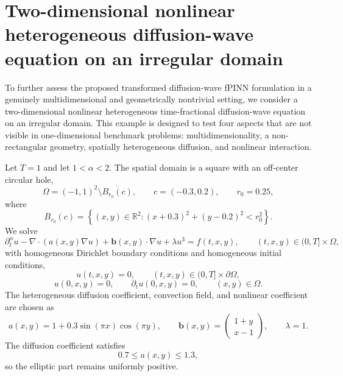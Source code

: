 \documentclass[11pt]{article}
\newcommand{\Dtalpha}{\partial_t^\alpha}
\newcommand{\R}{\mathbb{R}}
\newcommand{\bb}{\bm b}
\newcommand{\grad}{\nabla}
\begin{document}
\section{Two-dimensional nonlinear heterogeneous diffusion-wave equation on an irregular domain}
\label{sec:irregular-2d-dw}

To further assess the proposed transformed diffusion-wave fPINN formulation in a genuinely multidimensional and geometrically nontrivial setting, we consider a two-dimensional nonlinear heterogeneous time-fractional diffusion-wave equation on an irregular domain. This example is designed to test four aspects that are not visible in one-dimensional benchmark problems: multidimensionality, a non-rectangular geometry, spatially heterogeneous diffusion, and nonlinear interaction.

Let $T=1$ and let $1<\alpha<2$. The spatial domain is a square with an off-center circular hole,
\begin{equation}
\Omega=
(-1,1)^2\setminus \overline{B_{r_0}(c)},
\qquad
c=(-0.3,0.2),
\qquad
r_0=0.25,
\label{eq:irregular-domain}
\end{equation}
where
\[
B_{r_0}(c)=\left\{(x,y)\in\R^2:(x+0.3)^2+(y-0.2)^2<r_0^2\right\}.
\]
We solve
\begin{equation}
\Dtalpha u
-
\grad\cdot\left(a(x,y)\grad u\right)
+
\bb(x,y)\cdot\grad u
+
\lambda u^3
=
f(t,x,y),
\qquad
(t,x,y)\in(0,T]\times\Omega,
\label{eq:irregular-2d-pde}
\end{equation}
with homogeneous Dirichlet boundary conditions and homogeneous initial conditions,
\begin{equation}
 u(t,x,y)=0,
\qquad
(t,x,y)\in(0,T]\times\partial\Omega,
\label{eq:irregular-2d-bc}
\end{equation}
\begin{equation}
 u(0,x,y)=0,
\qquad
 \partial_t u(0,x,y)=0,
\qquad
(x,y)\in\Omega.
\label{eq:irregular-2d-ic}
\end{equation}
The heterogeneous diffusion coefficient, convection field, and nonlinear coefficient are chosen as
\begin{equation}
 a(x,y)=1+0.3\sin(\pi x)\cos(\pi y),
\qquad
 \bb(x,y)=\begin{pmatrix}1+y\\ x-1\end{pmatrix},
\qquad
 \lambda=1.
\label{eq:irregular-2d-coefficients}
\end{equation}
The diffusion coefficient satisfies
\[
0.7\leq a(x,y)\leq 1.3,
\]
so the elliptic part remains uniformly positive.
\end{document}
